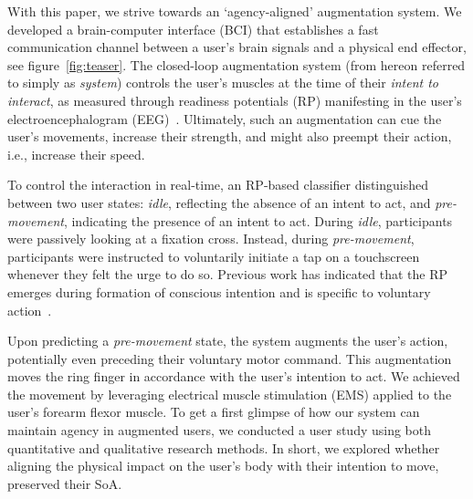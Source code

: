 With this paper, we strive towards an `agency-aligned' augmentation system. We developed a brain-computer interface (BCI) that establishes a fast communication channel between a user's brain signals and a physical end effector, see figure~\ref{fig:teaser}. The closed-loop augmentation system (from hereon referred to simply as \textit{system}) controls the user's muscles at the time of their \textit{intent to interact}, as measured through readiness potentials (RP) manifesting in the user's electroencephalogram (EEG)~\cite{Schurger2021-vp, Schultze-Kraft2016-bx, Schultze-Kraft2021-cu}. Ultimately, such an augmentation can cue the user's movements, increase their strength, and might also preempt their action, i.e., increase their speed.


To control the interaction in real-time, an RP-based classifier distinguished between two user states: \textit{idle}, reflecting the absence of an intent to act, and \textit{pre-movement}, indicating the presence of an intent to act. During \textit{idle}, participants were passively looking at a fixation cross. Instead, during \textit{pre-movement}, participants were instructed to voluntarily initiate a tap on a touchscreen whenever they felt the urge to do so. Previous work has indicated that the RP emerges during formation of conscious intention and is specific to voluntary action~\cite{Schultze-Kraft2020-rm, Travers2020-hf, Pares-Pujolras2019-ll}.

Upon predicting a \textit{pre-movement} state, the system augments the user's action, potentially even preceding their voluntary motor command. This augmentation moves the ring finger in accordance with the user's intention to act. We achieved the movement by leveraging electrical muscle stimulation (EMS) applied to the user's forearm flexor muscle. To get a first glimpse of how our system can maintain agency in augmented users, we conducted a user study using both quantitative and qualitative research methods. In short, we explored whether aligning the physical impact on the user's body with their intention to move, preserved their SoA.